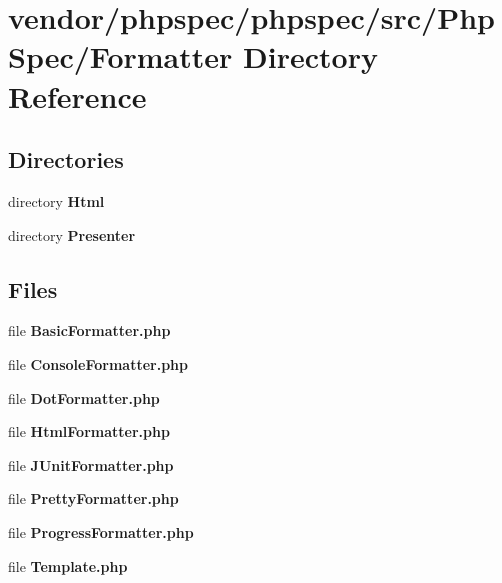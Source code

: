 \section{vendor/phpspec/phpspec/src/\+Php\+Spec/\+Formatter Directory Reference}
\label{dir_ba79f6e81dfb7dd4bb8b1ecfc2eab35d}
\subsection*{Directories}
\begin{DoxyCompactItemize}
\item 
directory {\bf Html}
\item 
directory {\bf Presenter}
\end{DoxyCompactItemize}
\subsection*{Files}
\begin{DoxyCompactItemize}
\item 
file {\bf Basic\+Formatter.\+php}
\item 
file {\bf Console\+Formatter.\+php}
\item 
file {\bf Dot\+Formatter.\+php}
\item 
file {\bf Html\+Formatter.\+php}
\item 
file {\bf J\+Unit\+Formatter.\+php}
\item 
file {\bf Pretty\+Formatter.\+php}
\item 
file {\bf Progress\+Formatter.\+php}
\item 
file {\bf Template.\+php}
\end{DoxyCompactItemize}
